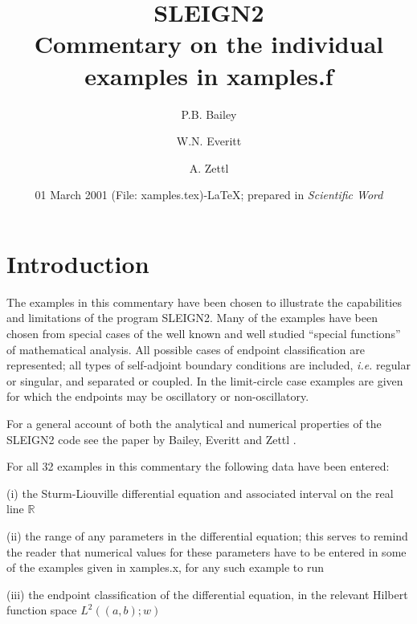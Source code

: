 \documentclass[12pt]{amsart}%
\theoremstyle{plain}
\numberwithin{equation}{section}
\begin{document}
\title[SLEIGN2]{SLEIGN2\\Commentary on the individual examples in xamples.f}
\author{P.B. Bailey}
\address{P.B. Bailey, c/o Department of Mathematical Sciences, Northern Illinois
University, DeKalb, IL 60155-2888, USA}
\author{W.N. Everitt}
\address{W.N. Everitt, School of Mathematics and Statistics, University of Birmingham,
Edgbaston, Birmingham B15 2TT, England, UK}
\author{A. Zettl}
\address{A. Zettl, Department of Mathematical Sciences, Northern Illinois University,
DeKalb, IL 60155-2888, USA}
\date{01 March 2001 (File: xamples.tex)\quad\AmS  -\LaTeX  {}; prepared in
\textsl{Scientific Word\/}{}}
\maketitle


\section{Introduction}

The examples in this commentary have been chosen to illustrate the
capabilities and limitations of the program SLEIGN2. Many of the examples have
been chosen from special cases of the well known and well studied ``special
functions'' of mathematical analysis. All possible cases of endpoint
classification are represented; all types of self-adjoint boundary conditions
are included, \textit{i.e.} regular or singular, and separated or coupled. In
the limit-circle case examples are given for which the endpoints may be
oscillatory or non-oscillatory.

For a general account of both the analytical and numerical properties of the
SLEIGN2 code see the paper by Bailey, Everitt and Zettl \cite{BEZ3}.

For all 32 examples in this commentary the following data have been entered:

(i) the Sturm-Liouville differential equation and associated interval on the
real line $\mathbb{R}$

(ii) the range of any parameters in the differential equation; this serves to
remind the reader that numerical values for these parameters have to be
entered in some of the examples given in xamples.x, for any such example to run

(iii) the endpoint classification of the differential equation, in the
relevant Hilbert function space $L^{2}((a,b);w)$
\end{document}
